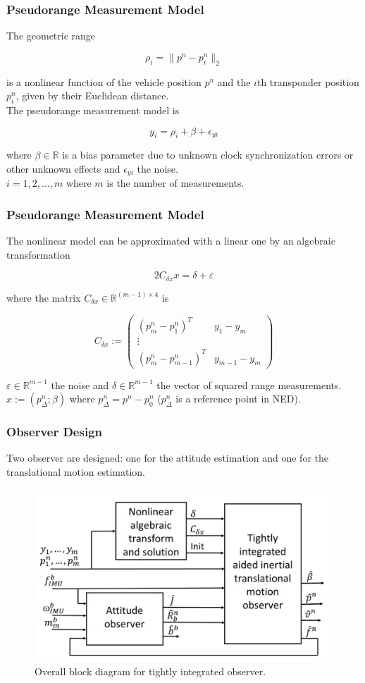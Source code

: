 \documentclass{beamer}
\begin{document}
	\begin{frame}
	\frametitle{Pseudorange Measurement Model}
	
	The geometric range 
	
	\[ \rho_i = \|p^n - p^n_i\|_2 \]
	
	is a nonlinear function of the vehicle position $p^n$ and the $i$th transponder position $p^n_i$, given by their Euclidean distance.
	\\ The pseudorange measurement model is
	
	\[ y_i = \rho_i + \beta + \epsilon_{yi} \]
	
	where $\beta \in \mathds{R}$ is a bias parameter due to unknown clock synchronization errors or other unknown effects and $\epsilon_{yi}$ the noise.
	\\ $i = 1,2,...,m$ where $m$ is the number of measurements.
	\end{frame}
	
	\begin{frame}
	\frametitle{Pseudorange Measurement Model}
	The nonlinear model can be approximated with a linear one by an algebraic transformation 
	
		\[ 2C_{\delta x}x = \delta + \varepsilon  \]
		
	where the matrix $C_{\delta x} \in \mathds{R}^{(m-1)\times4}$ is
	
	$$
	C_{\delta x} :=
	\begin{pmatrix}
	(p^n_m - p^n_1)^T & y_1 - y_m \\
	\vdots \\
	(p^n_m - p^n_{m-1})^T & y_{m-1} - y_m 
	\end{pmatrix} 
	$$
	
	$\varepsilon \in \mathds{R}^{m-1}$ the noise and $\delta \in \mathds{R}^{m-1}$ the vector of squared range measurements. \\ $x := (p^n_\Delta;\beta)$ where $p_\Delta^n = p^n - p^n_0$ ($p_\Delta^n$ is a reference point in NED). 
	\end{frame}

	\begin{frame}
	\frametitle{Observer Design}
	Two observer are designed: one for the attitude estimation and one for the translational motion estimation. 
		\begin{figure}[H]
		\centering
		\includegraphics[scale=0.3]{observers}
		\caption{Overall block diagram for tightly integrated observer.}
	\end{figure}
	\end{frame}
\end{document}
